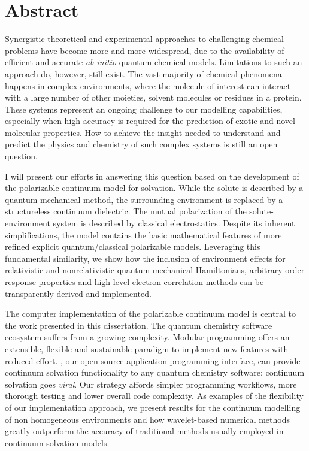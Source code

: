 \begingroup
\let\clearpage\relax
\let\cleardoublepage\relax
\let\cleardoublepage\relax

\chapter*{Abstract}

Synergistic theoretical and experimental approaches to challenging
chemical problems have become more and more widespread, due to the
availability of efficient and accurate \emph{ab initio} quantum chemical
models.
Limitations to such an approach do, however, still exist.
The vast majority of chemical phenomena happens in complex environments,
where the molecule of interest can interact with a large number of other
moieties, solvent molecules or residues in a protein.
These systems represent an ongoing challenge to our modelling
capabilities, especially when high accuracy is required for the
prediction of exotic and novel molecular properties.
How to achieve the insight needed to understand and predict the physics
and chemistry of such complex systems is still an open question.

I will present our efforts in answering this question based on the
development of the polarizable continuum model for solvation.
While the solute is described by a quantum mechanical method, the
surrounding environment is replaced by a structureless continuum
dielectric.
The mutual polarization of the solute-environment system is described by
classical electrostatics.
Despite its inherent simplifications, the model contains the basic
mathematical features of more refined explicit quantum/classical
polarizable models.
Leveraging this fundamental similarity, we show how the
inclusion of environment effects for relativistic and nonrelativistic
quantum mechanical Hamiltonians, arbitrary order response properties and
high-level electron correlation methods can be transparently derived and
implemented.

The computer implementation of the polarizable continuum model is
central to the work presented in this dissertation.
The quantum chemistry software ecosystem suffers from a growing
complexity. Modular programming offers an extensible, flexible and
sustainable paradigm to implement new features with reduced effort.
\pcmsolver, our open-source application programming interface, can
provide continuum solvation functionality to any quantum chemistry
software: continuum solvation goes \emph{viral}.
Our strategy affords simpler programming workflows, more thorough
testing and lower overall code complexity.
As examples of the flexibility of our implementation approach, we
present results for the continuum modelling of non homogeneous
environments and how wavelet-based numerical methods greatly outperform
the accuracy of traditional methods usually employed in continuum
solvation models.

